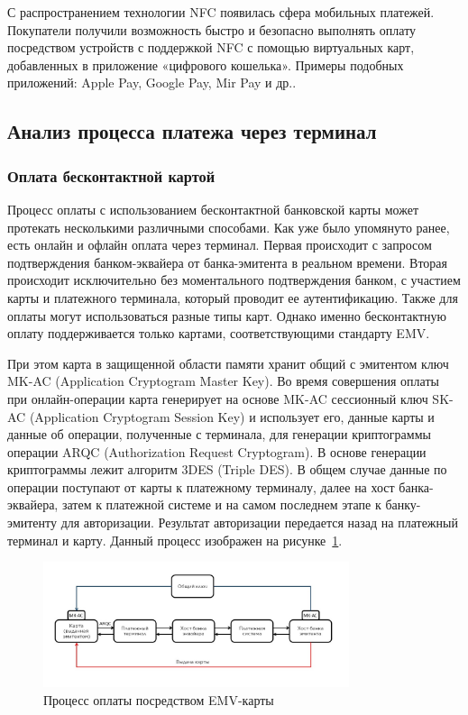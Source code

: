 С распространением технологии NFC появилась сфера мобильных платежей.
Покупатели получили возможность быстро и безопасно выполнять оплату посредством устройств с поддержкой NFC с помощью виртуальных карт, добавленных в приложение «цифрового кошелька».
Примеры подобных приложений: Apple Pay, Google Pay, Mir Pay и др..


\subsection{Анализ процесса платежа через терминал}

\subsubsection{Оплата бесконтактной картой}
\label{subsubsec:contactless_payment}

Процесс оплаты с использованием бесконтактной банковской карты может протекать несколькими различными способами.
Как уже было упомянуто ранее, есть онлайн и офлайн оплата через терминал.
Первая происходит с запросом подтверждения банком-эквайера от банка-эмитента в реальном времени.
Вторая происходит исключительно без моментального подтверждения банком, с участием карты и платежного терминала, который проводит ее аутентификацию.
Также для оплаты могут использоваться разные типы карт.
Однако именно бесконтактную оплату поддерживается только картами, соответствующими стандарту EMV.

При этом карта в защищенной области памяти хранит общий с эмитентом ключ MK-AC (Application Cryptogram Master Key).
Во время совершения оплаты при онлайн-операции карта генерирует на основе MK-AC сессионный ключ SK-AC (Application Cryptogram Session Key) и использует его, данные карты и данные об операции, полученные с терминала, для генерации криптограммы операции ARQC (Authorization Request Cryptogram).
В основе генерации криптограммы лежит алгоритм 3DES (Triple DES).
В общем случае данные по операции поступают от карты к платежному терминалу, далее на хост банка-эквайера, затем к платежной системе и на самом последнем этапе к банку-эмитенту для авторизации.
Результат авторизации передается назад на платежный терминал и карту.
Данный процесс изображен на рисунке~\ref{fig:emv_card_payment}.

\begin{figure}[H]
    \centering
    \includegraphics[width=0.8\textwidth]{images/research/emv_card_payment}
    \caption{\centering Процесс оплаты посредством EMV-карты}
    \label{fig:emv_card_payment}
\end{figure}

